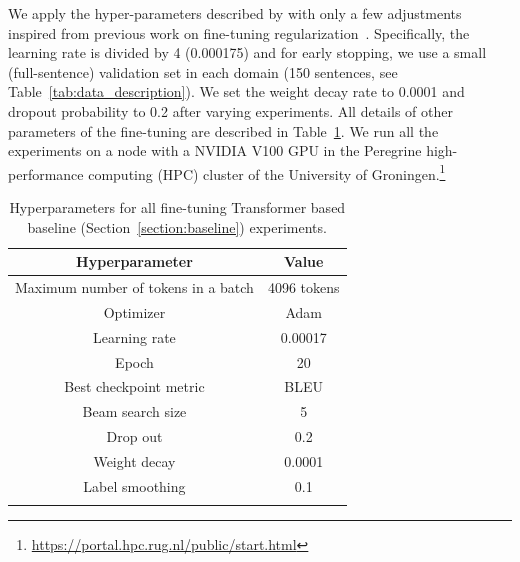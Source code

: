 We apply the hyper-parameters described by \cite{ng-etal-2019-facebook} with only a few adjustments inspired from previous work on fine-tuning regularization~\parencite{miceli-barone-etal-2017-regularization}. Specifically, the learning rate is divided by 4 (0.000175) and  for early stopping, we use a small (full-sentence) validation set in each domain (150 sentences, see Table~\ref{tab:data_description}). We set the weight decay rate to 0.0001 and dropout probability to 0.2 after varying experiments. All details of other parameters of the fine-tuning are described in Table~\ref{tab:hyperparameter}.
We run all the experiments on a node with a \textsc{NVIDIA} V100 GPU in the Peregrine high-performance computing (HPC) cluster of the University of Groningen.\footnote{\url{https://portal.hpc.rug.nl/public/start.html}}


\begin{table}[ht!]
\centering
\begin{tabular}{c|c}
\Xhline{3\arrayrulewidth}
\textbf{Hyperparameter}             & \textbf{Value} \\ \hline
Maximum number of tokens in a batch & 4096 tokens    \\ \hline
Optimizer                           & Adam           \\ \hline
Learning rate                       & 0.00017        \\ \hline
Epoch                               & 20             \\ \hline
Best checkpoint metric              & BLEU           \\ \hline
Beam search size                    & 5              \\ \hline
Drop out                            & 0.2            \\ \hline
Weight decay                        & 0.0001         \\ \hline
Label smoothing                     & 0.1            \\ \Xhline{3\arrayrulewidth}
\end{tabular}
\caption{Hyperparameters for all fine-tuning Transformer based baseline (Section~\ref{section:baseline}) experiments.}
\label{tab:hyperparameter}
\end{table}